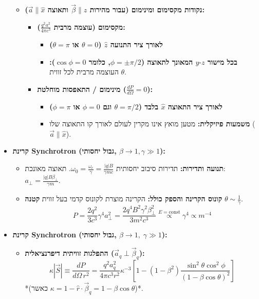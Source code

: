 \documentclass[10pt,a4paper]{article}
\begin{document}
\begin{multicols*}{2}
\begin{itemize}[leftmargin=*]
\begin{itemize}
    \item \textbf{נקודות מקסימום ומינימום (עבור מהירות $\vec{\beta}\parallel\hat{z}$ ותאוצה $\vec{a}\parallel\hat{x}$):}
\begin{itemize}
    \item \textbf{מקסימום (עוצמה מרבית $\frac{q^2 a^2}{4\pi c^3}$):}
    \begin{itemize}
        \item \textbf{לאורך ציר התנועה $\hat{z}$ ($\theta=0$ או $\theta=\pi$)}
        \item \textbf{בכל מישור $y\text{-}z$ המאונך לתאוצה ($\phi=\pm\pi/2$, כלומר $\cos\phi=0$):} העוצמה מרבית לכל זווית $\theta$.
    \end{itemize}

    \item \textbf{מינימום / התאפסות מוחלטת ($\frac{dP}{d\Omega} = 0$):}
    \begin{itemize}
        \item \textbf{לאורך ציר התאוצה $\hat{x}$ בלבד ($\theta=\pi/2$ וגם $\phi=0$ או $\phi=\pi$)}
        \item \textbf{משמעות פיזיקלית:} מטען מואץ אינו מקרין לעולם לאורך קו התאוצה שלו ($\vec{a} \parallel \hat{x}$).
    \end{itemize}
\end{itemize}
\end{itemize}

\item \textbf{קרינת Synchrotron (גבול יחסותי, $\beta \to 1, \gamma \gg 1$):}
\begin{itemize}
    \item \textbf{תנועה ותדירות:} תדירות סיבוב יחסותית $\omega_0 = \frac{\omega_c}{\gamma} = \frac{|q| B}{\gamma m c}$. תאוצה מאונכת: $a_\perp = \frac{|q| B \beta_\perp}{\gamma m}$.
    \item \textbf{קונוס הקרינה והספק כולל:} הקרינה מוצרת לקונוס קדמי בעל זווית \textbf{קטנה} $\theta \sim \frac{1}{\gamma}$.
    $$P = \frac{2 q^2}{3 c^3} \gamma^4 a_\perp^2 = \frac{2 q^4 B^2 \gamma^2 \beta_\perp^2}{3 m^2 c^3} \overset{E=\text{const}}{\propto} \gamma^4 \propto m^{-4}$$
\end{itemize}

\item \textbf{קרינת Synchrotron (גבול יחסותי, $\beta \to 1, \; \gamma \gg 1$):}
\begin{itemize}
    \item \textbf{התפלגות זוויתית דיפרנציאלית ($\vec{a}_q \perp \vec{\beta}_q$):}
    $$\kappa |\vec{S}| \equiv \frac{dP}{d\Omega \, r^2} = \frac{q^2 a_q^2}{4\pi c^3 r^2} \kappa^{-3} \left[ 1 - (1-\beta^2) \frac{\sin^2\theta\cos^2\phi}{(1-\beta\cos\theta)^2} \right]$$
    *(כאשר $\kappa = 1 - \hat{r} \cdot \vec{\beta}_q = 1 - \beta\cos\theta$)*.
    

\end{itemize}
\end{itemize}
\end{multicols*}
\end{document}
